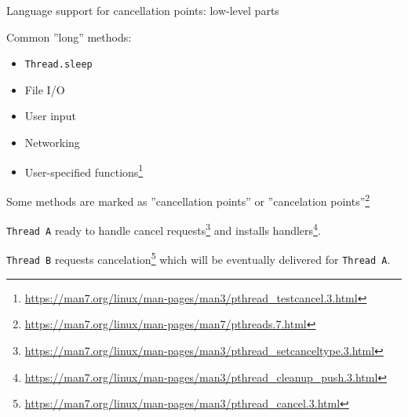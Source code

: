 \begin{frame}{Language support for cancellation points: low-level parts}

Common ''long'' methods:
\begin{itemize}
    \item \texttt{Thread.sleep}
    \item File I/O
    \item User input
    \item Networking
    \pause
    \item User-specified functions\footnote<2->{\tiny\url{https://man7.org/linux/man-pages/man3/pthread_testcancel.3.html}}
\end{itemize}

\pause

Some methods are marked as ''cancellation points'' or ''cancelation points''\footnote<3->{\tiny\url{https://man7.org/linux/man-pages/man7/pthreads.7.html}}

\pause

\texttt{Thread A} ready to handle cancel requests\footnote<4->{\tiny\url{https://man7.org/linux/man-pages/man3/pthread_setcanceltype.3.html}} and installs handlers\footnote<4->{\tiny\url{https://man7.org/linux/man-pages/man3/pthread_cleanup_push.3.html}}.

\pause

\texttt{Thread B} requests cancelation\footnote<5->{\tiny\url{https://man7.org/linux/man-pages/man3/pthread_cancel.3.html}} which will be eventually delivered for \texttt{Thread A}.

\end{frame}


